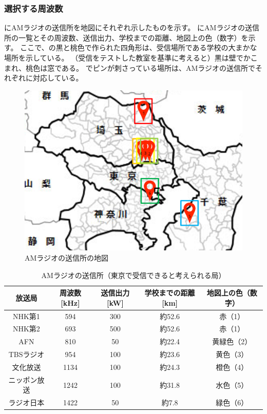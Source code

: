 \documentclass[report.tex]{subfiles}
\begin{document}
\subsubsection{選択する周波数}

にAMラジオの送信所を地図にそれぞれ示したものを示す。
にAMラジオの送信所の一覧とその周波数、送信出力、学校までの距離、地図上の色（数字）を示す。
ここで、の黒と桃色で作られた四角形は、受信場所である学校の大まかな場所を示している。
（受信をテストした教室を基準に考えると）黒は壁でかこまれ、桃色は窓である。
でピンが刺さっている場所は、AMラジオの送信所でそれぞれに対応している。

\begin{figure}[H]
	\centering
	\includegraphics[width=15cm]{use/map.png}
	\caption{AMラジオの送信所の地図}
	\label{fig:map}
\end{figure}

\begin{table}[H]
	\centering
	\caption{AMラジオの送信所（東京で受信できると考えられる局）}
	\label{tab:zyushin}
	\begin{tabular}{ccccc} \hline
		放送局    & 周波数[kHz] & 送信出力[kW] & 学校までの距離[km] & 地図上の色（数字） \\ \hline
		NHK第1  & 594      & 300      & 約52.6       & 赤（1）      \\
		NHK第2  & 693      & 500      & 約52.6       & 赤（1）      \\
		AFN    & 810      & 50       & 約22.4       & 黄緑色（2）    \\
		TBSラジオ & 954      & 100      & 約23.6       & 黄色（3）     \\
		文化放送   & 1134     & 100      & 約24.3       & 橙色（4）     \\
		ニッポン放送 & 1242     & 100      & 約31.8       & 水色（5）     \\
		ラジオ日本  & 1422     & 50       & 約7.8        & 緑色（6）     \\ \hline
	\end{tabular}
\end{table}
\end{document}
